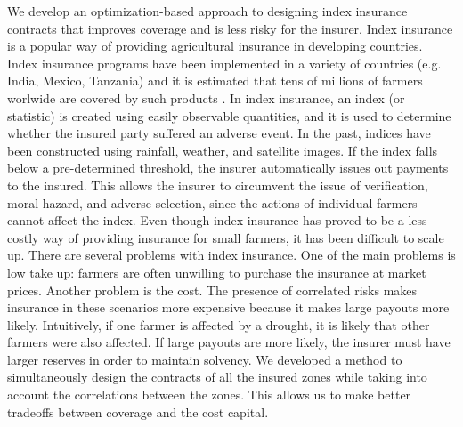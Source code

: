 \documentclass[11pt]{article}
\begin{document}
We develop an optimization-based approach to designing index insurance contracts that improves coverage and is less risky for the insurer. Index insurance is a popular way of providing agricultural insurance in developing countries. Index insurance programs have been implemented in a variety of countries (e.g. India, Mexico, Tanzania) and it is estimated that tens of millions of farmers worlwide are covered by such products \cite{greatrex2015scaling}. In index insurance, an index (or statistic) is created using easily observable quantities, and it is used to determine whether the insured party suffered an adverse event. In the past, indices have been constructed using rainfall, weather, and satellite images. If the index falls below a pre-determined threshold, the insurer automatically issues out payments to the insured. This allows the insurer to circumvent the issue of verification, moral hazard, and adverse selection, since the actions of individual farmers cannot affect the index. Even though index insurance has proved to be a less costly way of providing insurance for small farmers, it has been difficult to scale up. There are several problems with index insurance. One of the main problems is low take up: farmers are often unwilling to purchase the insurance at market prices. Another problem  is the cost. The presence of correlated risks makes insurance in these scenarios more expensive because it makes large payouts more likely. Intuitively, if one farmer is affected by a drought, it is likely that other farmers were also affected. If large payouts are more likely, the insurer must have larger reserves in order to maintain solvency. We developed a method to simultaneously design the contracts of all the insured zones while taking into account the correlations between the zones. This allows us to make better tradeoffs between coverage and the cost capital.
\end{document}
